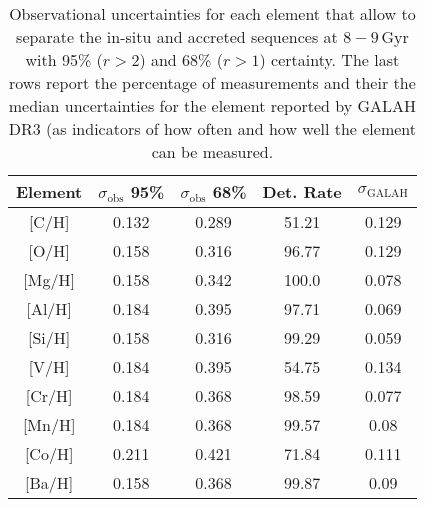 \begin{table}
    \centering
    \caption{Observational uncertainties for each element that allow to separate the in-situ and accreted sequences at $8-9\,\mathrm{Gyr}$ with 95\% ($r>2$) and 68\% ($r>1$) certainty. The last rows report the percentage of measurements and their the median uncertainties for the element reported by GALAH DR3 (as indicators of how often and how well the element can be measured.}
    \begin{tabular}{ccccc}
    \hline
    Element & $\sigma_\text{obs}$ 95\% & $\sigma_\text{obs}$ 68\% & Det. Rate & $\sigma_\text{GALAH}$ \\
    \hline \hline
    {[C/H]}  & 0.132 & 0.289 & 51.21 & 0.129 \\
    {[O/H]}  & 0.158 & 0.316 & 96.77 & 0.129 \\
    {[Mg/H]}  & 0.158 & 0.342 & 100.0 & 0.078 \\
    {[Al/H]}  & 0.184 & 0.395 & 97.71 & 0.069 \\
    {[Si/H]}  & 0.158 & 0.316 & 99.29 & 0.059 \\
    {[V/H]}  & 0.184 & 0.395 & 54.75 & 0.134 \\
    {[Cr/H]}  & 0.184 & 0.368 & 98.59 & 0.077 \\
    {[Mn/H]}  & 0.184 & 0.368 & 99.57 & 0.08 \\
    {[Co/H]}  & 0.211 & 0.421 & 71.84 & 0.111 \\
    {[Ba/H]}  & 0.158 & 0.368 & 99.87 & 0.09 \\
    \hline
    \end{tabular}
    \label{tab:uncertainties}
\end{table}
